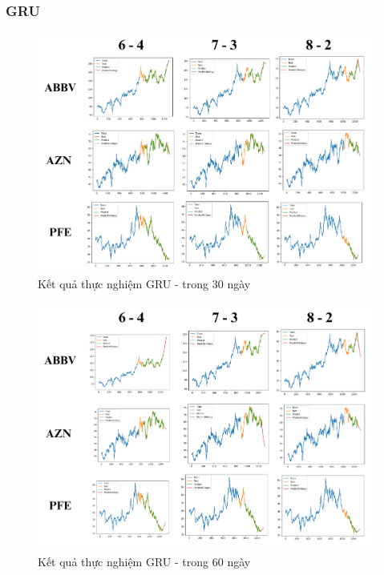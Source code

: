 \documentclass[conference]{IEEEtran}
\begin{document}
\subsubsection{GRU}
\vspace{-30pt}
\begin{figure}[H]
    \centering
    \begin{minipage}{0.5\textwidth}
    \centering
    \includegraphics[width=1\textwidth]{Image/GRU30.png}
    \caption{Kết quả thực nghiệm GRU - trong 30 ngày}
    \label{fig:1}
    \end{minipage}
\end{figure}
\vspace{-40pt}
\begin{figure}[H]
    \centering
    \begin{minipage}{0.5\textwidth}
    \centering
    \includegraphics[width=1\textwidth]{Image/GRU60.png}
    \caption{Kết quả thực nghiệm GRU - trong 60 ngày}
    \label{fig:1}
    \end{minipage}
\end{figure}
\end{document}
